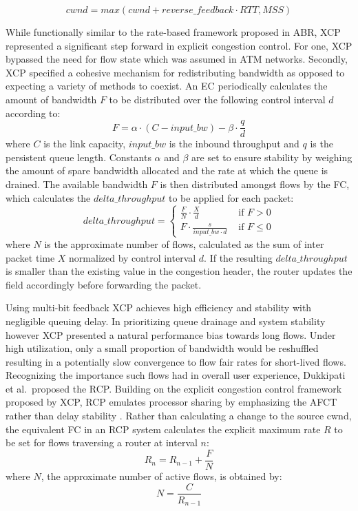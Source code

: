 \begin{equation}
cwnd = max\left (  cwnd + reverse\_feedback \cdot RTT, MSS\right )
\label{eqn:xcpcwnd}
\end{equation}


While functionally similar to the rate-based framework proposed in \ac{ABR}, \ac{XCP} represented a significant step forward in explicit congestion control.
For one, \ac{XCP} bypassed the need for flow state which was assumed in \ac{ATM} networks.
Secondly, \ac{XCP} specified a cohesive mechanism for redistributing bandwidth as opposed to expecting a variety of methods to coexist.
An \ac{EC} periodically calculates the amount of bandwidth $F$ to be distributed over the following control interval $d$ according to:
\begin{equation}
F=\alpha\cdot\left ( C - input\_bw \right ) - \beta\cdot\frac{q}{d}
\label{eqn:ec}
\end{equation}
where $C$ is the link capacity, $input\_bw$ is the inbound throughput and $q$ is the persistent queue length.
Constants $\alpha$ and $\beta$ are set to ensure stability by weighing the amount of spare bandwidth allocated and the rate at which the queue is drained.
The available bandwidth $F$ is then distributed amongst flows by the \ac{FC}, which calculates the $delta\_throughput$ to be applied for each packet:
\begin{equation}
delta\_throughput = \begin{cases}
\frac{F}{N} \cdot \frac{X}{d} & \text{ if } F> 0 \\ 
F \cdot \frac{s}{input\_bw \cdot d} & \text{ if } F\leq 0 
\end{cases}
\end{equation}
where $N$ is the approximate number of flows, calculated as the sum of inter packet time $X$ normalized by control interval $d$.
If the resulting $delta\_throughput$ is smaller than the existing value in the congestion header, the router updates the field accordingly before forwarding the packet.

Using multi-bit feedback \ac{XCP} achieves high efficiency and stability with negligible queuing delay.
In prioritizing queue drainage and system stability however \ac{XCP} presented a natural performance bias towards long flows.
Under high utilization, only a small proportion of bandwidth would be reshuffled resulting in a potentially slow convergence to flow fair rates for short-lived flows.
Recognizing the importance such flows had in overall user experience, Dukkipati et al.\ proposed the \ac{RCP}.
Building on the explicit congestion control framework proposed by \ac{XCP}, \ac{RCP} emulates processor sharing by emphasizing the \ac{AFCT} rather than delay stability \cite{Dukkipati:2005p78}.
Rather than calculating a change to the source \ac{cwnd}, the equivalent \ac{FC} in an \ac{RCP} system calculates the explicit maximum rate $R$ to be set for flows traversing a router at interval $n$:
\begin{equation}
R_n = R_{n-1} + \frac{F}{N}
\end{equation}
where $N$, the approximate number of active flows, is obtained by:
\begin{equation}
N = \frac{C}{R_{n-1}}
\end{equation}

